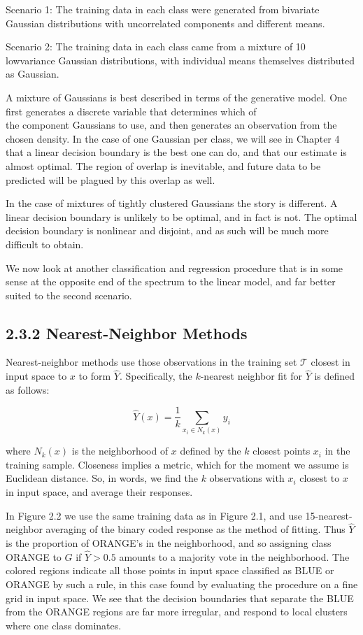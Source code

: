 \documentclass[10pt]{article}
\begin{document}
Scenario 1: The training data in each class were generated from bivariate Gaussian distributions with uncorrelated components and different means.

Scenario 2: The training data in each class came from a mixture of 10 lowvariance Gaussian distributions, with individual means themselves distributed as Gaussian.

A mixture of Gaussians is best described in terms of the generative model. One first generates a discrete variable that determines which of\\
the component Gaussians to use, and then generates an observation from the chosen density. In the case of one Gaussian per class, we will see in Chapter 4 that a linear decision boundary is the best one can do, and that our estimate is almost optimal. The region of overlap is inevitable, and future data to be predicted will be plagued by this overlap as well.

In the case of mixtures of tightly clustered Gaussians the story is different. A linear decision boundary is unlikely to be optimal, and in fact is not. The optimal decision boundary is nonlinear and disjoint, and as such will be much more difficult to obtain.

We now look at another classification and regression procedure that is in some sense at the opposite end of the spectrum to the linear model, and far better suited to the second scenario.

\subsection*{2.3.2 Nearest-Neighbor Methods}
Nearest-neighbor methods use those observations in the training set $\mathcal{T}$ closest in input space to $x$ to form $\hat{Y}$. Specifically, the $k$-nearest neighbor fit for $\hat{Y}$ is defined as follows:


\begin{equation*}
\hat{Y}(x)=\frac{1}{k} \sum_{x_{i} \in N_{k}(x)} y_{i} \tag{2.8}
\end{equation*}


where $N_{k}(x)$ is the neighborhood of $x$ defined by the $k$ closest points $x_{i}$ in the training sample. Closeness implies a metric, which for the moment we assume is Euclidean distance. So, in words, we find the $k$ observations with $x_{i}$ closest to $x$ in input space, and average their responses.

In Figure 2.2 we use the same training data as in Figure 2.1, and use 15-nearest-neighbor averaging of the binary coded response as the method of fitting. Thus $\hat{Y}$ is the proportion of ORANGE's in the neighborhood, and so assigning class ORANGE to $\hat{G}$ if $\hat{Y}>0.5$ amounts to a majority vote in the neighborhood. The colored regions indicate all those points in input space classified as BLUE or ORANGE by such a rule, in this case found by evaluating the procedure on a fine grid in input space. We see that the decision boundaries that separate the BLUE from the ORANGE regions are far more irregular, and respond to local clusters where one class dominates.
\end{document}
